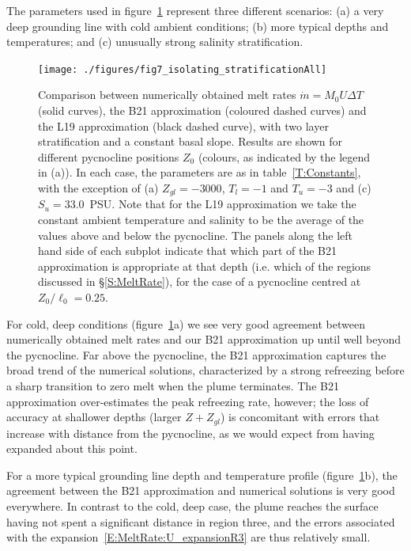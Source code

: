\documentclass[openacc]{rsproca_new}%
\begin{document}
The parameters used in figure~\ref{fig:Numerics:PycnoclinePosition} represent three different scenarios: (a) a very deep grounding line with cold ambient conditions; (b) more typical depths and temperatures; and (c) unusually strong salinity stratification.

\begin{figure}
\centering
\texttt{[image: ./figures/fig7\_isolating\_stratificationAll]}
\caption{Comparison between numerically obtained melt rates $\dot{m}= M_0 U \Delta T$ (solid curves), the B21 approximation (coloured dashed curves) and the L19 approximation (black dashed curve), with two layer stratification and a constant basal slope. Results are shown for different pycnocline positions $Z_0$ (colours, as indicated by the legend in (a)). In each case, the parameters are as in table~\ref{T:Constants}, with the exception of (a) $Z_{gl} = -3000$, $T_l = -1$ and $T_u = -3$ and (c)  $S_u = 33.0$~PSU. Note that for the L19 approximation we take the constant ambient temperature and salinity to be the average of the values above and below the pycnocline. The panels along the left hand side of each subplot indicate that which part of the B21 approximation is appropriate at that depth (i.e. which of the regions discussed in \S\ref{S:MeltRate}), for the case of a pycnocline centred at $Z_0/\ell_0 = 0.25$.}\label{fig:Numerics:PycnoclinePosition}
\end{figure}

For cold, deep conditions (figure~\ref{fig:Numerics:PycnoclinePosition}a) we see very good agreement between numerically obtained melt rates and our B21 approximation up until well beyond the pycnocline. Far above the pycnocline,  the B21 approximation captures the broad trend of the numerical solutions, characterized by a strong refreezing before a sharp transition to zero melt when the plume terminates. The B21 approximation over-estimates the peak refreezing rate, however; the loss of accuracy at shallower depths (larger $Z + Z_{gl}$) is concomitant with errors that increase with distance from the pycnocline, as we would expect from having expanded about this point.

For a more typical grounding line depth and temperature profile (figure~\ref{fig:Numerics:PycnoclinePosition}b), the agreement between the B21 approximation and numerical solutions is very good everywhere. In contrast to the cold, deep case, the plume reaches the surface having not spent a significant distance in region three, and the errors associated with the expansion~\eqref{E:MeltRate:U_expansionR3} are thus relatively small.
\end{document}
